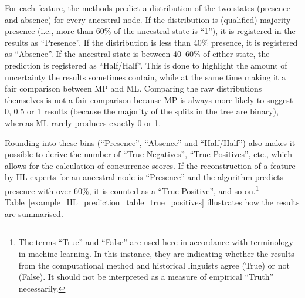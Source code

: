 \documentclass[12pt,letterpaper]{article}
\begin{document}

For each feature, the methods predict a distribution of the two states (presence and absence) for every ancestral node. If the distribution is (qualified) majority presence (i.e., more than 60\% of the ancestral state is ``1''), it is registered in the results as ``Presence''. If the distribution is less than 40\% presence, it is registered as ``Absence''. If the ancestral state is between 40--60\% of either state, the prediction is registered as ``Half/Half''. This is done to highlight the amount of uncertainty the results sometimes contain, while at the same time making it a fair comparison between MP and ML. Comparing the raw distributions themselves is not a fair comparison because MP is always more likely to suggest 0, 0.5 or 1 results (because the majority of the splits in the tree are binary), whereas ML rarely produces exactly 0 or 1. 

Rounding into these bins (``Presence'', ``Absence'' and ``Half/Half'') also makes it possible to derive the number of ``True Negatives'', ``True Positives'', etc., which allows for the calculation of concurrence scores. If the reconstruction of a feature by HL experts for an ancestral node is ``Presence'' and the algorithm predicts presence with over 60\%, it is counted as a ``True Positive'', and so on.\footnote{The terms ``True'' and ``False'' are used here in accordance with terminology in machine learning. In this instance, they are indicating whether the results from the computational method and historical linguists agree (True) or not (False). It should not be interpreted as a measure of empirical ``Truth'' necessarily.} Table~\ref{example_HL_prediction_table_true_positives} illustrates how the results are summarised.
\end{document}
